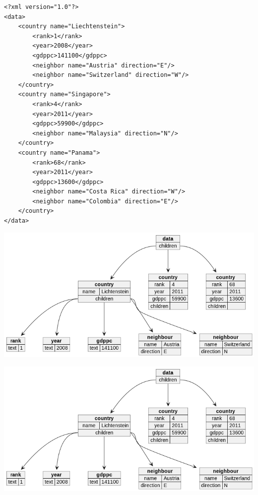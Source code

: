 \begin{frame}[fragile]
%
\begin{tcbraster}[raster columns=2,
                  raster equal height,
                  nobeforeafter,
                  raster column skip=0.1cm]
\begin{codebox}
\begin{verbatim}
<?xml version="1.0"?>
<data>
    <country name="Liechtenstein">
        <rank>1</rank>
        <year>2008</year>
        <gdppc>141100</gdppc>
        <neighbor name="Austria" direction="E"/>
        <neighbor name="Switzerland" direction="W"/>
    </country>
    <country name="Singapore">
        <rank>4</rank>
        <year>2011</year>
        <gdppc>59900</gdppc>
        <neighbor name="Malaysia" direction="N"/>
    </country>
    <country name="Panama">
        <rank>68</rank>
        <year>2011</year>
        <gdppc>13600</gdppc>
        <neighbor name="Costa Rica" direction="W"/>
        <neighbor name="Colombia" direction="E"/>
    </country>
</data>
\end{verbatim}
\end{codebox}
%
\begin{defbox}[Vizualization]
	\begin{minipage}{.35\linewidth}
	\includegraphics[width=\linewidth, trim={2cm 2cm 12cm 2cm}, clip]{./gfx/22-xml-countries}
	\end{minipage}
	\begin{minipage}{.60\linewidth}
	\includegraphics[width=\linewidth, trim={2cm 18.5cm 12cm 2cm}, clip]{./gfx/22-xml-countries}
	\end{minipage}
\end{defbox}
\end{tcbraster}
%
\end{frame}

